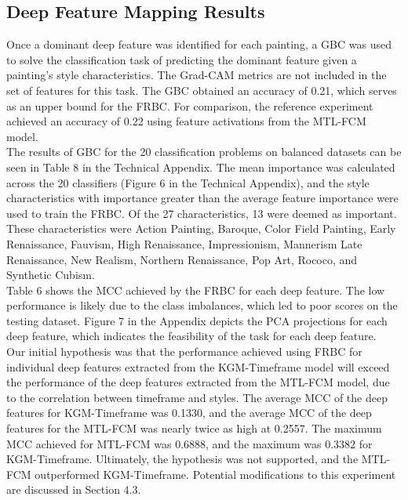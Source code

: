 \documentclass{article}
\begin{document}
\subsection{Deep Feature Mapping Results}
Once a dominant deep feature was identified for each painting, a GBC was used to solve the classification task of predicting the dominant feature given a painting's style characteristics. The Grad-CAM metrics are not included in the set of features for this task. The GBC obtained an accuracy of 0.21, which serves as an upper bound for the FRBC. For comparison, the reference experiment achieved an accuracy of 0.22 using feature activations from the MTL-FCM model.\\

The results of GBC for the 20 classification problems on balanced datasets can be seen in Table 8 in the Technical Appendix. The mean importance was calculated across the 20 classifiers (Figure 6 in the Technical Appendix), and the style characteristics with importance greater than the average feature importance were used to train the FRBC. Of the 27 characteristics, 13 were deemed as important. These characteristics were Action Painting, Baroque, Color Field Painting, Early Renaissance, Fauvism, High Renaissance, Impressionism, Mannerism Late Renaissance, New Realism, Northern Renaissance, Pop Art, Rococo, and Synthetic Cubism.\\

Table 6 shows the MCC achieved by the FRBC for each deep feature. The low performance is likely due to the class imbalances, which led to poor scores on the testing dataset. Figure 7 in the Appendix depicts the PCA projections for each deep feature, which indicates the feasibility of the task for each deep feature. \\

Our initial hypothesis was that the performance achieved using FRBC for individual deep features extracted from the KGM-Timeframe model will exceed the performance of the deep features extracted from the MTL-FCM model, due to the correlation between timeframe and styles. The average MCC of the deep features for KGM-Timeframe was 0.1330, and the average MCC of the deep features for the MTL-FCM was nearly twice as high at 0.2557. The maximum MCC achieved for MTL-FCM was 0.6888, and the maximum was 0.3382 for KGM-Timeframe. Ultimately, the hypothesis was not supported, and the MTL-FCM outperformed KGM-Timeframe. Potential modifications to this experiment are discussed in Section 4.3.\\
\end{document}
